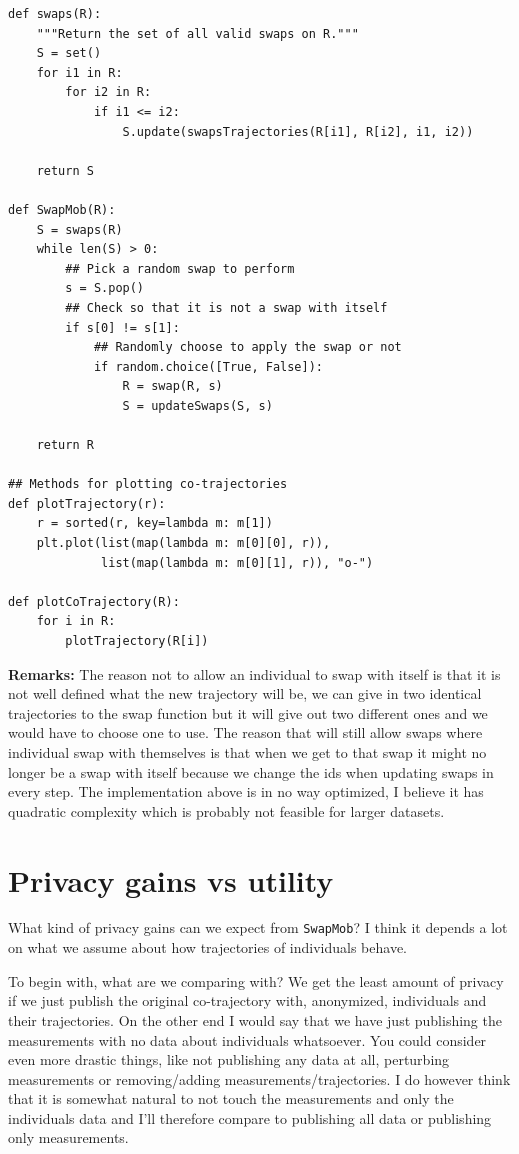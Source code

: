 \documentclass[11pt]{article}
\begin{document}
\begin{verbatim}
def swaps(R):
    """Return the set of all valid swaps on R."""
    S = set()
    for i1 in R:
        for i2 in R:
            if i1 <= i2:
                S.update(swapsTrajectories(R[i1], R[i2], i1, i2))

    return S

def SwapMob(R):
    S = swaps(R)
    while len(S) > 0:
        ## Pick a random swap to perform
        s = S.pop()
        ## Check so that it is not a swap with itself
        if s[0] != s[1]:
            ## Randomly choose to apply the swap or not
            if random.choice([True, False]):
                R = swap(R, s)
                S = updateSwaps(S, s)

    return R

## Methods for plotting co-trajectories
def plotTrajectory(r):
    r = sorted(r, key=lambda m: m[1])
    plt.plot(list(map(lambda m: m[0][0], r)),
             list(map(lambda m: m[0][1], r)), "o-")

def plotCoTrajectory(R):
    for i in R:
        plotTrajectory(R[i])
\end{verbatim}

\textbf{Remarks:} The reason not to allow an individual to swap with itself
 is that it is not well defined what the new trajectory will be, we
 can give in two identical trajectories to the swap function but it
 will give out two different ones and we would have to choose one to
 use. The reason that will still allow swaps where individual swap
 with themselves is that when we get to that swap it might no longer
 be a swap with itself because we change the ids when updating swaps
 in every step. The implementation above is in no way optimized, I
 believe it has quadratic complexity which is probably not feasible
 for larger datasets.
\section{Privacy gains vs utility}
\label{sec:org2e4e918}
What kind of privacy gains can we expect from \texttt{SwapMob}? I think it
depends a lot on what we assume about how trajectories of individuals
behave.

To begin with, what are we comparing with? We get the least amount of
privacy if we just publish the original co-trajectory with,
anonymized, individuals and their trajectories. On the other end I
would say that we have just publishing the measurements with no data
about individuals whatsoever. You could consider even more drastic
things, like not publishing any data at all, perturbing measurements
or removing/adding measurements/trajectories. I do however think that
it is somewhat natural to not touch the measurements and only the
individuals data and I'll therefore compare to publishing all data or
publishing only measurements.
\end{document}

